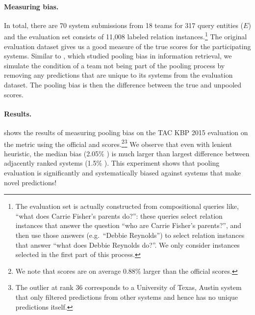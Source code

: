 \paragraph{Measuring bias.}
In total, there are 70 system submissions from 18 teams for 317 query entities ($E$) and the evaluation set consists of 11,008 labeled relation instances.\footnote{%
  The evaluation set is actually constructed from compositional queries like, ``what does Carrie Fisher's parents do?'':
  these queries select relation instances that answer the question ``who are Carrie Fisher's parents?'', and then use those answers (e.g.\ ``Debbie Reynolds'') to select relation instances that answer ``what does Debbie Reynolds do?''.
  We only consider instances selected in the first part of this process.
}
The original evaluation dataset gives us a good measure of the true scores for the participating systems.
Similar to \citet{zobel1998reliable}, which studied pooling bias in information retrieval,
we simulate the condition of a team not being part of the pooling process by removing any predictions that are unique to its systems from the evaluation dataset.
The pooling bias is then the difference between the true and unpooled scores.

\paragraph{Results.}
 shows the results of measuring pooling bias on the TAC KBP 2015 evaluation on the \fone{} metric using the official and \anydoc{} scores.\footnote{%
  We note that \anydoc{} scores are on average 0.88\%\fone{} larger than the official scores. 
  }\footnote{
  The outlier at rank 36 corresponds to a University of Texas, Austin system that only filtered predictions from other systems and hence has no unique predictions itself.
  }
We observe that even with lenient \anydoc{} heuristic, the median bias (2.05\% \fone{}) is much larger than largest difference between adjacently ranked systems (1.5\% \fone{}).
This experiment shows that pooling evaluation is significantly and systematically biased against systems that make novel predictions!


